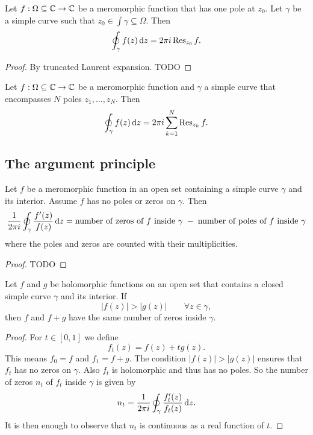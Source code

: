 \begin{proposition}
Let $f: \Omega\subseteq \mathbb{C}\to \mathbb{C}$ be a meromorphic function that has one pole at $z_0$. Let $\gamma$ be a simple curve such that $z_0\in \int\gamma \subseteq \Omega$. Then
\[ \oint_\gamma f(z) \operatorname{d \!}{z} = 2\pi i \operatorname{Res}_{z_0}f. \]
\end{proposition}
\begin{proof}
By truncated Laurent expansion. TODO
\end{proof}
\begin{corollary} \label{residueFormula}
Let $f: \Omega\subseteq \mathbb{C}\to \mathbb{C}$ be a meromorphic function and $\gamma$ a simple curve that encompasses $N$ poles $z_1, \ldots, z_N$. Then
\[ \oint_{\gamma} f(z)\operatorname{d \!}{z} = 2\pi i \sum_{k=1}^N\operatorname{Res}_{z_k}f. \]
\end{corollary}

\subsection{The argument principle}
\begin{proposition}
Let $f$ be a meromorphic function in an open set containing a simple curve $\gamma$ and its interior. Assume $f$ has no poles or zeros on $\gamma$. Then
\[ \frac{1}{2\pi i}\oint_\gamma \frac{f'(z)}{f(z)}\operatorname{d \!}{z} = \text{number of zeros of $f$ inside $\gamma$} \;-\; \text{number of poles of $f$ inside $\gamma$} \]
where the poles and zeros are counted with their multiplicities.
\end{proposition}
\begin{proof}
TODO
\end{proof}

\begin{theorem} \label{RoucheTheorem}
Let $f$ and $g$ be holomorphic functions on an open set that contains a closed simple curve $\gamma$ and its interior. If
\[ |f(z)| > |g(z)| \qquad \forall z\in \gamma, \]
then $f$ and $f+g$ have the same number of zeros inside $\gamma$.
\end{theorem}
\begin{proof}
For $t\in [0, 1]$ we define
\[ f_t(z) = f(z) + tg(z). \]
This means $f_0 = f$ and $f_1 = f+g$. The condition $|f(z)| > |g(z)|$ ensures that $f_t$ has no zeros on $\gamma$. Also $f_t$ is holomorphic and thus has no poles. So the number of zeros $n_t$ of $f_t$ inside $\gamma$ is given by
\[ n_t = \frac{1}{2\pi i}\oint_\gamma \frac{f_t'(z)}{f_t(z)}\operatorname{d \!}{z}. \]
It is then enough to observe that $n_t$ is continuous as a real function of $t$.
\end{proof}

